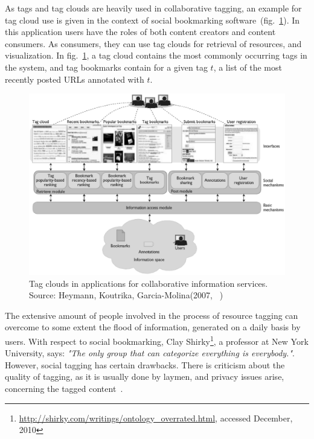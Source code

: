 As tags and tag clouds are heavily used in collaborative tagging, an example for tag cloud use is given in the context of social bookmarking software~(fig.~\ref{collaborativeTagging}). In this application users have the roles of both content creators and content consumers. As consumers, they can use tag clouds for retrieval of resources, and visualization. In fig.~\ref{collaborativeTagging}, a tag cloud contains the most commonly occurring tags in the system, and tag bookmarks contain for a given tag $t$, a list of the most recently posted URLs annotated with $t$.  \\  

\begin{figure}
	\centering
	\includegraphics[scale=0.6]{img/collaborativeTagging} 
	\caption[Tag clouds in collaborative information services]
           {Tag clouds in applications for collaborative information services. Source: Heymann, Koutrika, Garcia-Molina(2007, ~\cite{tagcloud_spam2007})}
\label{collaborativeTagging}
\end{figure}

The extensive amount of people involved in the process of resource tagging can overcome to some extent the flood of information, generated on a daily basis by users. With respect to social bookmarking, Clay Shirky\footnote{\url{http://shirky.com/writings/ontology_overrated.html}, accessed December, 2010}, a professor at New York University, says: \textit{"The only group that can categorize everything is everybody."}. However, social tagging has certain drawbacks. There is criticism about the quality of tagging, as it is usually done by laymen, and privacy issues arise, concerning the tagged content~\cite{folksonomiesWeb2.0_2009}. \\



